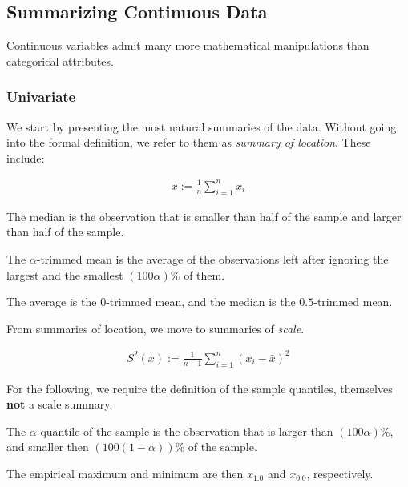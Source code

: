 \subsection{Summarizing  Continuous Data}
Continuous variables admit many more mathematical manipulations than categorical attributes. 


\subsubsection{Univariate}

We start by presenting the most natural summaries of the data. Without going into the formal definition, we refer to them as \emph{summary of location}.
These include:

\begin{definition}
\begin{align}
	\bar{x}:= \frac{1}{n}\sum_{i=1}^{n} x_i
\end{align}
\end{definition}

\begin{definition}
The median is the observation that is smaller than half of the sample and larger than half of the sample.
\end{definition}

\begin{definition}
The $\alpha$-trimmed mean is the average of the observations left after ignoring the largest and the smallest $(100\alpha) \%$ of them.
\end{definition}
The \naive average is the $0$-trimmed mean, and the median is the $0.5$-trimmed mean.

From summaries of location, we move to summaries of \emph{scale}. 

\begin{definition}
\begin{align}
	S^2(x):= \frac{1}{n-1} \sum_{i=1}^{n} (x_i-\bar{x})^2
\end{align}
\end{definition}

For the following, we require the definition of the sample quantiles, themselves \textbf{not} a scale summary.

\begin{definition}
The $\alpha$-quantile of the sample is the observation that is larger than $(100\alpha)\%$, and smaller then  $(100(1-\alpha))\%$ of the sample. 
\end{definition}
The empirical maximum and minimum are then $x_{1.0}$ and $x_{0.0}$, respectively.


